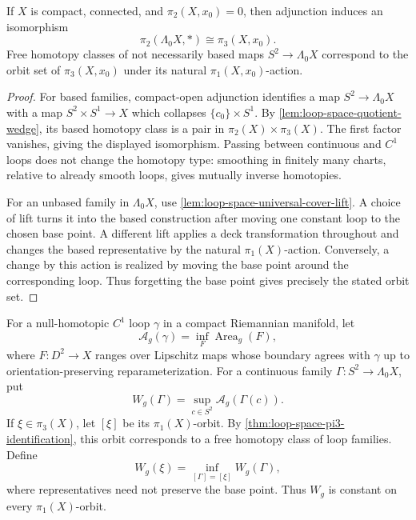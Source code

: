 \begin{theorem}
\label{thm:loop-space-pi3-identification}
\notready
If $X$ is compact, connected, and $\pi_2(X,x_0)=0$, then adjunction induces
an isomorphism
\[
 \pi_2(\Lambda_0X,*)\cong\pi_3(X,x_0).
\]
Free homotopy classes of not necessarily based maps
$S^2\to\Lambda_0X$ correspond to the orbit set of $\pi_3(X,x_0)$ under its
natural $\pi_1(X,x_0)$-action.
\end{theorem}

\begin{proof}
For based families, compact-open adjunction identifies a map
$S^2\to\Lambda_0X$ with a map $S^2\times S^1\to X$ which collapses
$\{c_0\}\times S^1$.  By \ref{lem:loop-space-quotient-wedge}, its based
homotopy class is a pair in $\pi_2(X)\times\pi_3(X)$.  The first factor
vanishes, giving the displayed isomorphism.  Passing between continuous and
$C^1$ loops does not change the homotopy type: smoothing in finitely many
charts, relative to already smooth loops, gives mutually inverse homotopies.

For an unbased family in $\Lambda_0X$, use
\ref{lem:loop-space-universal-cover-lift}.  A choice of lift turns it into the
based construction after moving one constant loop to the chosen base point.
A different lift applies a deck transformation throughout and changes the
based representative by the natural $\pi_1(X)$-action.  Conversely, a change
by this action is realized by moving the base point around the corresponding
loop.  Thus forgetting the base point gives precisely the stated orbit set.
\end{proof}

\begin{definition}
\label{def:loop-family-width}
\notready
For a null-homotopic $C^1$ loop $\gamma$ in a compact Riemannian manifold,
let
\[
 \mathcal A_g(\gamma)=\inf_F\operatorname{Area}_g(F),
\]
where $F\colon D^2\to X$ ranges over Lipschitz maps whose boundary agrees
with $\gamma$ up to orientation-preserving reparameterization.  For a
continuous family $\Gamma\colon S^2\to\Lambda_0X$, put
\[
 W_g(\Gamma)=\sup_{c\in S^2}\mathcal A_g(\Gamma(c)).
\]
If $\xi\in\pi_3(X)$, let $[\xi]$ be its $\pi_1(X)$-orbit.  By
\ref{thm:loop-space-pi3-identification}, this orbit corresponds to a free
homotopy class of loop families.  Define
\[
 W_g(\xi)=\inf_{[\Gamma]=[\xi]}W_g(\Gamma),
\]
where representatives need not preserve the base point.  Thus $W_g$ is
constant on every $\pi_1(X)$-orbit.
\end{definition}

